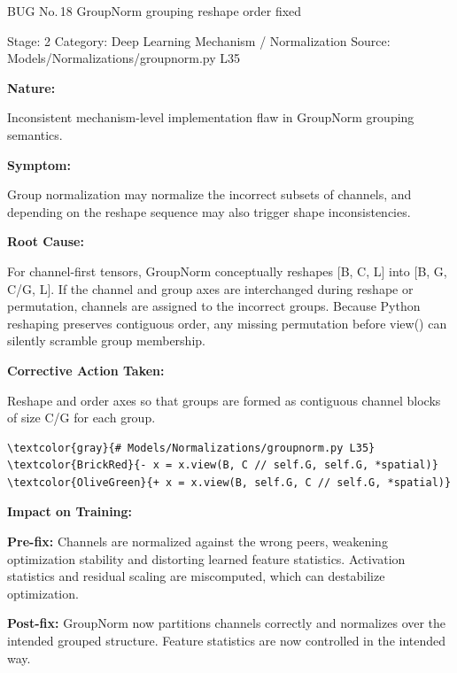 \documentclass[10pt]{article}
\newcommand{\FieldLabel}[1]{%
 {\bfseries #1:}\par
}
\begin{document}
\begin{bugbox}{BUG No.\,18 \quad GroupNorm grouping reshape order fixed}
{\color{MetaGray}\small Stage: 2 \;\textbar\; Category: Deep Learning Mechanism / Normalization \;\textbar\; Source: Models/Normalizations/groupnorm.py L35\par}
\vspace{0.22em}
\FieldLabel{Nature}
Inconsistent mechanism-level implementation flaw in GroupNorm grouping semantics.
\par
\vspace{0.35em}
\FieldLabel{Symptom}
Group normalization may normalize the incorrect subsets of channels, and depending on the reshape sequence may also trigger shape inconsistencies.
\par
\vspace{0.35em}
\FieldLabel{Root Cause}
For channel-first tensors, GroupNorm conceptually reshapes {[}B, C, L{]} into {[}B, G, C/G, L{]}. If the channel and group axes are interchanged during reshape or permutation, channels are assigned to the incorrect groups. Because Python reshaping preserves contiguous order, any missing permutation before view() can silently scramble group membership.
\par
\vspace{0.35em}
\FieldLabel{Corrective Action Taken}
Reshape and order axes so that groups are formed as contiguous channel blocks of size C/G for each group.
\par
\vspace{0.35em}
\begin{Verbatim}[commandchars=\\\{\},fontsize=\footnotesize,breaklines=true,breaksymbol={},frame=leftline,framerule=2pt,rulecolor=\color{gray!40},xleftmargin=6pt,formatcom=\singlespacing]
\textcolor{gray}{# Models/Normalizations/groupnorm.py L35}
\textcolor{BrickRed}{- x = x.view(B, C // self.G, self.G, *spatial)}
\textcolor{OliveGreen}{+ x = x.view(B, self.G, C // self.G, *spatial)}
\end{Verbatim}
\vspace{0.22em}
\FieldLabel{Impact on Training}
\textbf{Pre-fix:} Channels are normalized against the wrong peers, weakening optimization stability and distorting learned feature statistics. Activation statistics and residual scaling are miscomputed, which can destabilize optimization. \par\smallskip
\textbf{Post-fix:} GroupNorm now partitions channels correctly and normalizes over the intended grouped structure. Feature statistics are now controlled in the intended way. 
\par
\vspace{0.35em}
\end{bugbox}
\end{document}

